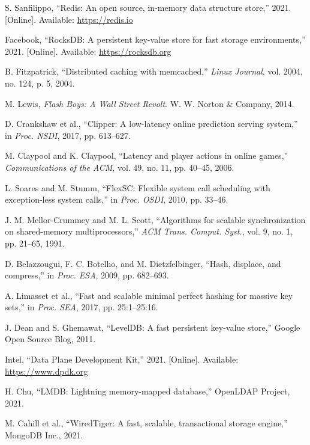 \documentclass[10pt,conference]{IEEEtran}
\begin{document}

\begin{thebibliography}{99}

S. Sanfilippo, ``Redis: An open source, in-memory data structure store,'' 2021. [Online]. Available: \url{https://redis.io}

Facebook, ``RocksDB: A persistent key-value store for fast storage environments,'' 2021. [Online]. Available: \url{https://rocksdb.org}

B. Fitzpatrick, ``Distributed caching with memcached,'' \textit{Linux Journal}, vol. 2004, no. 124, p. 5, 2004.

M. Lewis, \textit{Flash Boys: A Wall Street Revolt}. W. W. Norton \& Company, 2014.

D. Crankshaw et al., ``Clipper: A low-latency online prediction serving system,'' in \textit{Proc. NSDI}, 2017, pp. 613--627.

M. Claypool and K. Claypool, ``Latency and player actions in online games,'' \textit{Communications of the ACM}, vol. 49, no. 11, pp. 40--45, 2006.

L. Soares and M. Stumm, ``FlexSC: Flexible system call scheduling with exception-less system calls,'' in \textit{Proc. OSDI}, 2010, pp. 33--46.

J. M. Mellor-Crummey and M. L. Scott, ``Algorithms for scalable synchronization on shared-memory multiprocessors,'' \textit{ACM Trans. Comput. Syst.}, vol. 9, no. 1, pp. 21--65, 1991.

D. Belazzougui, F. C. Botelho, and M. Dietzfelbinger, ``Hash, displace, and compress,'' in \textit{Proc. ESA}, 2009, pp. 682--693.

A. Limasset et al., ``Fast and scalable minimal perfect hashing for massive key sets,'' in \textit{Proc. SEA}, 2017, pp. 25:1--25:16.

J. Dean and S. Ghemawat, ``LevelDB: A fast persistent key-value store,'' Google Open Source Blog, 2011.

Intel, ``Data Plane Development Kit,'' 2021. [Online]. Available: \url{https://www.dpdk.org}

H. Chu, ``LMDB: Lightning memory-mapped database,'' OpenLDAP Project, 2021.

M. Cahill et al., ``WiredTiger: A fast, scalable, transactional storage engine,'' MongoDB Inc., 2021.


\end{thebibliography}
\end{document}
